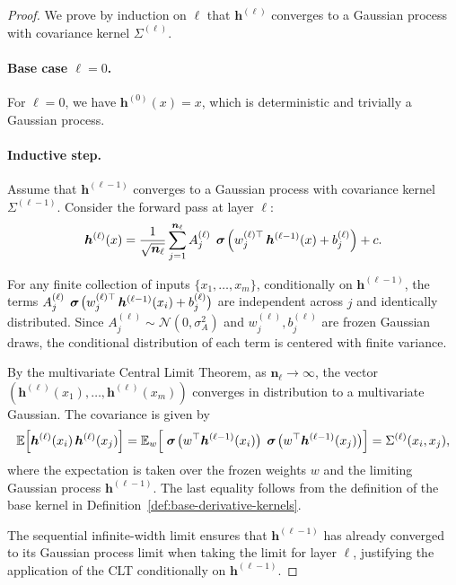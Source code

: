 \begin{proof}
We prove by induction on \( \ell \) that \( \bm{h}^{(\ell)} \) converges to a Gaussian process with covariance kernel \( \Sigma^{(\ell)} \).

\paragraph{Base case \( \ell=0 \).}
For \( \ell=0 \), we have \( \bm{h}^{(0)}(x) = x \), which is deterministic and trivially a Gaussian process.

\paragraph{Inductive step.}
Assume that \( \bm{h}^{(\ell-1)} \) converges to a Gaussian process with covariance kernel \( \Sigma^{(\ell-1)} \). Consider the forward pass at layer \( \ell \):
\begin{align}
\bm{h}^{(\ell)}(x) = \frac{1}{\sqrt{\bm{n}_\ell}} \sum_{j=1}^{\bm{n}_\ell} A^{(\ell)}_j\,\bm{\mathrel{\boldsymbol{\sigma}}}\!\Big(w^{(\ell)\top}_j\,\bm{h}^{(\ell-1)}(x) + b^{(\ell)}_j\Big) + c.
\end{align}

For any finite collection of inputs \( \{x_1, \dots, x_m\} \), conditionally on \( \bm{h}^{(\ell-1)} \), the terms \( A^{(\ell)}_j\,\bm{\mathrel{\boldsymbol{\sigma}}}\!\big(w^{(\ell)\top}_j\,\bm{h}^{(\ell-1)}(x_i) + b^{(\ell)}_j\big) \) are independent across \( j \) and identically distributed. Since \( A^{(\ell)}_j \sim \mathcal{N}(0, \sigma_A^2) \) and \( w^{(\ell)}_j, b^{(\ell)}_j \) are frozen Gaussian draws, the conditional distribution of each term is centered with finite variance.

By the multivariate Central Limit Theorem, as \( \bm{n}_\ell \to \infty \), the vector \( (\bm{h}^{(\ell)}(x_1), \dots, \bm{h}^{(\ell)}(x_m)) \) converges in distribution to a multivariate Gaussian. The covariance is given by
\begin{align}
\mathbb{E}\Big[\bm{h}^{(\ell)}(x_i)\,\bm{h}^{(\ell)}(x_j)\Big] = \mathbb{E}_{w}\Big[\bm{\mathrel{\boldsymbol{\sigma}}}\!\big(w^\top \bm{h}^{(\ell-1)}(x_i)\big)\,\bm{\mathrel{\boldsymbol{\sigma}}}\!\big(w^\top \bm{h}^{(\ell-1)}(x_j)\big)\Big] = \Sigma^{(\ell)}(x_i, x_j),
\end{align}
where the expectation is taken over the frozen weights \( w \) and the limiting Gaussian process \( \bm{h}^{(\ell-1)} \). The last equality follows from the definition of the base kernel in Definition~\ref{def:base-derivative-kernels}.

The sequential infinite-width limit ensures that \( \bm{h}^{(\ell-1)} \) has already converged to its Gaussian process limit when taking the limit for layer \( \ell \), justifying the application of the CLT conditionally on \( \bm{h}^{(\ell-1)} \).
\end{proof}

